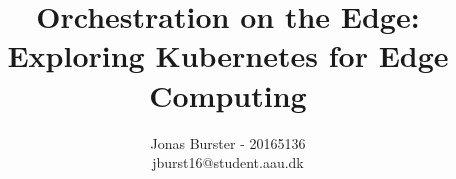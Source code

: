 \fancyhf{}
\title{Orchestration on the Edge:\\ Exploring Kubernetes for Edge Computing}
\author{Jonas Burster - 20165136\\jburst16@student.aau.dk}


\makeatletter
\let\runtitle\@title
\let\runauthor\@author
\makeatother
\lhead{\runtitle}



